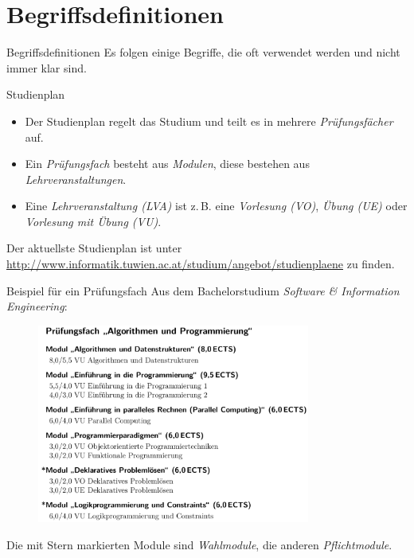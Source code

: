 \documentclass{beamer}
\begin{document}
\section{Begriffsdefinitionen}

\begin{frame}{Begriffsdefinitionen}
    Es folgen einige Begriffe, die oft verwendet werden und nicht immer klar
    sind.
\end{frame}

\begin{frame}{Studienplan}
    \begin{itemize}
        \item Der Studienplan regelt das Studium und teilt es in mehrere
              \textit{Prüfungsfächer} auf.
        \item Ein \textit{Prüfungsfach} besteht aus \textit{Modulen}, diese
              bestehen aus \textit{Lehrveranstaltungen}.
        \item Eine \textit{Lehrveranstaltung (LVA)} ist z.\,B. eine
              \textit{Vorlesung (VO)}, \textit{Übung (UE)} oder
              \textit{Vorlesung mit Übung (VU)}.
    \end{itemize}
    Der aktuellste Studienplan ist unter
    \url{http://www.informatik.tuwien.ac.at/studium/angebot/studienplaene}
    zu finden.
\end{frame}

\begin{frame}{Beispiel für ein Prüfungsfach}
    Aus dem Bachelorstudium \textit{Software \& Information Engineering}: \\
    \begin{figure}[htp]
        \centering
        \includegraphics[width=0.8\textwidth]{pruefungsfach.png}
    \end{figure}
    \small Die mit Stern markierten Module sind \textit{Wahlmodule}, die anderen
          \textit{Pflichtmodule}.
\end{frame}
\end{document}

